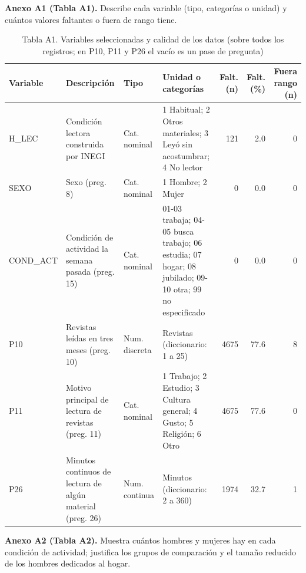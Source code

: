 \documentclass[
  spanish,
  12pt,
]{extarticle}
\begin{document}
\textbf{Anexo A1 (Tabla A1).} Describe cada variable (tipo, categorías o
unidad) y cuántos valores faltantes o fuera de rango tiene.

\begin{table}[H]

\caption{\label{tab:anexo1}Tabla A1. Variables seleccionadas y calidad de los datos (sobre todos los registros; en P10, P11 y P26 el vacío es un pase de pregunta)}
\centering
\begin{tabular}[t]{p{1.8cm}p{3.4cm}p{1.8cm}p{4.2cm}rrr}
\toprule
Variable & Descripción & Tipo & Unidad o categorías & Falt. (n) & Falt. (\%) & Fuera rango (n)\\
\midrule
H\_LEC & Condición lectora construida por INEGI & Cat. nominal & 1 Habitual; 2 Otros materiales; 3 Leyó sin acostumbrar; 4 No lector & 121 & 2.0 & 0\\
SEXO & Sexo (preg. 8) & Cat. nominal & 1 Hombre; 2 Mujer & 0 & 0.0 & 0\\
COND\_ACT & Condición de actividad la semana pasada (preg. 15) & Cat. nominal & 01-03 trabaja; 04-05 busca trabajo; 06 estudia; 07 hogar; 08 jubilado; 09-10 otra; 99 no especificado & 0 & 0.0 & 0\\
P10 & Revistas leídas en tres meses (preg. 10) & Num. discreta & Revistas (diccionario: 1 a 25) & 4675 & 77.6 & 8\\
P11 & Motivo principal de lectura de revistas (preg. 11) & Cat. nominal & 1 Trabajo; 2 Estudio; 3 Cultura general; 4 Gusto; 5 Religión; 6 Otro & 4675 & 77.6 & 0\\
\addlinespace
P26 & Minutos continuos de lectura de algún material (preg. 26) & Num. continua & Minutos (diccionario: 2 a 360) & 1974 & 32.7 & 1\\
\bottomrule
\end{tabular}
\end{table}

\textbf{Anexo A2 (Tabla A2).} Muestra cuántos hombres y mujeres hay en
cada condición de actividad; justifica los grupos de comparación y el
tamaño reducido de los hombres dedicados al hogar.
\end{document}
